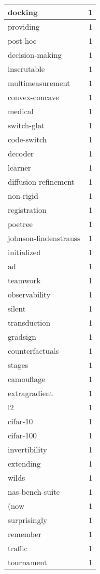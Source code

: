 \begin{table}[h]
\begin{tabular}{|l|r|}
\hline
docking & 1 \\
\hline
providing & 1 \\
\hline
post-hoc & 1 \\
\hline
decision-making & 1 \\
\hline
inscrutable & 1 \\
\hline
multimeasurement & 1 \\
\hline
convex-concave & 1 \\
\hline
medical & 1 \\
\hline
switch-glat & 1 \\
\hline
code-switch & 1 \\
\hline
decoder & 1 \\
\hline
learner & 1 \\
\hline
diffusion-refinement & 1 \\
\hline
non-rigid & 1 \\
\hline
registration & 1 \\
\hline
poetree & 1 \\
\hline
johnson-lindenstrauss & 1 \\
\hline
initialized & 1 \\
\hline
ad & 1 \\
\hline
teamwork & 1 \\
\hline
observability & 1 \\
\hline
silent & 1 \\
\hline
transduction & 1 \\
\hline
gradsign & 1 \\
\hline
counterfactuals & 1 \\
\hline
stages & 1 \\
\hline
camouflage & 1 \\
\hline
extragradient & 1 \\
\hline
l2 & 1 \\
\hline
cifar-10 & 1 \\
\hline
cifar-100 & 1 \\
\hline
invertibility & 1 \\
\hline
extending & 1 \\
\hline
wilds & 1 \\
\hline
nas-bench-suite & 1 \\
\hline
(now & 1 \\
\hline
surprisingly & 1 \\
\hline
remember & 1 \\
\hline
traffic & 1 \\
\hline
tournament & 1 \\
\hline

\end{tabular}
\end{table}
